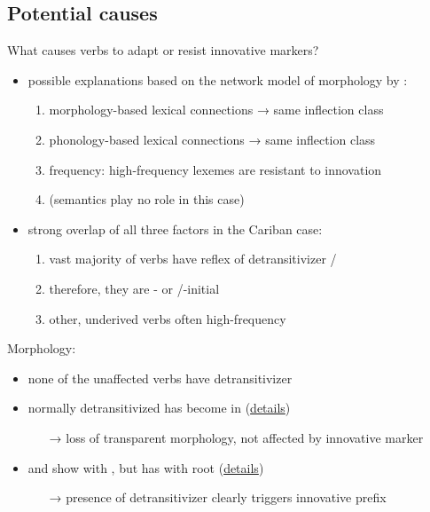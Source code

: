 \documentclass[9pt]{beamer}
\begin{document}
\subsection{Potential causes}
\begin{frame}{What causes verbs to adapt or resist innovative markers?}
\begin{itemize}
	\item possible explanations based on the network model of morphology by \textcites{bybee1985morphology}{bybee1995regular}:
\begin{enumerate}
	\item morphology-based lexical connections → same inflection class
	\item phonology-based lexical connections → same inflection class
	\item frequency: high-frequency lexemes are resistant to innovation
	\item (semantics play no role in this case)
\end{enumerate}
	\item strong overlap of all three factors in the Cariban case:\begin{enumerate}
	\item vast majority of  verbs have reflex of detransitivizer /
	\item therefore, they are - or /-initial
	\item other, underived  verbs often high-frequency
	\end{enumerate}
\end{itemize}
\end{frame}

\begin{frame}{Morphology: \PPek}
\begin{itemize}
	\item none of the unaffected verbs have detransitivizer
	\item normally detransitivized   has become  in \PPek (\hyperlink{tobathe}{details})\begin{itemize}
	\item[→] loss of transparent morphology, not affected by innovative marker \end{itemize}
	\item \bakairi and \ikpeng show  with  , but \arara has  with root  (\hyperlink{tocome}{details})\begin{itemize}
	\item[→] presence of detransitivizer clearly triggers innovative prefix\end{itemize}
\end{itemize}
\end{frame}
\end{document}

